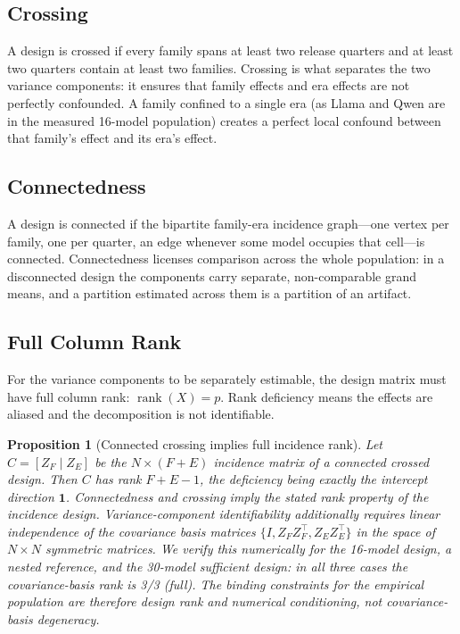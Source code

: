 \documentclass{ieeeaccess}
\theoremstyle{definition}
\theoremstyle{plain}
\newtheorem{proposition}{Proposition}
\begin{document}
\subsection{Crossing}
A design is crossed if every family spans at least two release quarters and at least two quarters contain at least two families. Crossing is what separates the two variance components: it ensures that family effects and era effects are not perfectly confounded. A family confined to a single era (as Llama and Qwen are in the measured 16-model population) creates a perfect local confound between that family's effect and its era's effect.

\subsection{Connectedness}
A design is connected if the bipartite family-era incidence graph---one vertex per family, one per quarter, an edge whenever some model occupies that cell---is connected. Connectedness licenses comparison across the whole population: in a disconnected design the components carry separate, non-comparable grand means, and a partition estimated across them is a partition of an artifact.

\subsection{Full Column Rank}
For the variance components to be separately estimable, the design matrix must have full column rank: $\operatorname{rank}(X) = p$. Rank deficiency means the effects are aliased and the decomposition is not identifiable.

\begin{proposition}[Connected crossing implies full incidence rank]
\label{prop:rank}
Let $C = [Z_F \mid Z_E]$ be the $N \times (F + E)$ incidence matrix of a connected crossed design. Then $C$ has rank $F + E - 1$, the deficiency being exactly the intercept direction $\mathbf{1}$. Connectedness and crossing imply the stated rank property of the incidence design. Variance-component identifiability additionally requires linear independence of the covariance basis matrices $\{I, Z_F Z_F^\top, Z_E Z_E^\top\}$ in the space of $N \times N$ symmetric matrices. We verify this numerically for the 16-model design, a nested reference, and the 30-model sufficient design: in all three cases the covariance-basis rank is 3/3 (full). The binding constraints for the empirical population are therefore design rank and numerical conditioning, not covariance-basis degeneracy.
\end{proposition}
\end{document}
